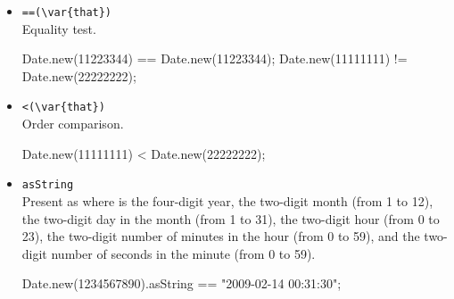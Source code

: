 \begin{itemize}
\item \lstinline|==(\var{that})|\\
  Equality test.
\begin{urbiassert}[firstnumber=last]
Date.new(11223344) == Date.new(11223344);
Date.new(11111111) != Date.new(22222222);
\end{urbiassert}

\item \lstinline|<(\var{that})|\\
  Order comparison.
\begin{urbiassert}[firstnumber=last]
Date.new(11111111) < Date.new(22222222);
\end{urbiassert}

\item \lstinline|asString|\\
  Present as  where  is the four-digit
  year,  the two-digit month (from 1 to 12),  the
  two-digit day in the month (from 1 to 31),  the two-digit
  hour (from 0 to 23),  the two-digit number of minutes in the
  hour (from 0 to 59), and  the two-digit number of seconds in
  the minute (from 0 to 59).
\begin{urbiassert}[firstnumber=last]
Date.new(1234567890).asString == "2009-02-14 00:31:30";
\end{urbiassert}

\end{itemize}



